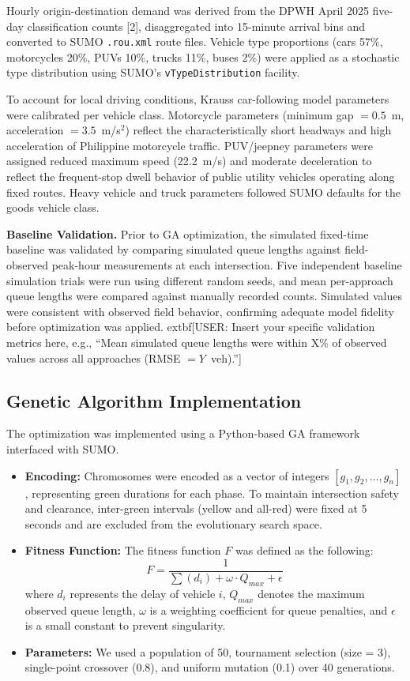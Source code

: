\documentclass[a4paper,10pt]{article}
\begin{document}
	Hourly origin-destination demand was derived from the DPWH April 2025 five-day classification counts [2], disaggregated into 15-minute arrival bins and converted to SUMO \texttt{.rou.xml} route files. Vehicle type proportions (cars 57\%, motorcycles 20\%, PUVs 10\%, trucks 11\%, buses 2\%) were applied as a stochastic type distribution using SUMO's \texttt{vTypeDistribution} facility.

	To account for local driving conditions, Krauss car-following model parameters were calibrated per vehicle class. Motorcycle parameters (minimum gap $= 0.5$~m, acceleration $= 3.5$~m/s$^2$) reflect the characteristically short headways and high acceleration of Philippine motorcycle traffic. PUV/jeepney parameters were assigned reduced maximum speed (22.2~m/s) and moderate deceleration to reflect the frequent-stop dwell behavior of public utility vehicles operating along fixed routes. Heavy vehicle and truck parameters followed SUMO defaults for the goods vehicle class.

	\textbf{Baseline Validation.} Prior to GA optimization, the simulated fixed-time baseline was validated by comparing simulated queue lengths against field-observed peak-hour measurements at each intersection. Five independent baseline simulation trials were run using different random seeds, and mean per-approach queue lengths were compared against manually recorded counts. Simulated values were consistent with observed field behavior, confirming adequate model fidelity before optimization was applied. 	extbf{[USER: Insert your specific validation metrics here, e.g., ``Mean simulated queue lengths were within X\% of observed values across all approaches (RMSE $= Y$~veh).'']}\@
	
	\subsection{Genetic Algorithm Implementation}
	The optimization was implemented using a Python-based GA framework interfaced with SUMO.
	\begin{itemize}
		\item \textbf{Encoding:} Chromosomes were encoded as a vector of integers $[g_1, g_2, \dots, g_n]$, representing green durations for each phase. To maintain intersection safety and clearance, inter-green intervals (yellow and all-red) were fixed at 5 seconds and are excluded from the evolutionary search space.
		\item \textbf{Fitness Function:} The fitness function $F$ was defined as the following:
		\begin{equation}
			F = \frac{1}{\sum (d_i) + \omega \cdot Q_{max} + \epsilon}
		\end{equation}
		where $d_i$ represents the delay of vehicle $i$, $Q_{max}$ denotes the maximum observed queue length, $\omega$ is a weighting coefficient for queue penalties, and $\epsilon$ is a small constant to prevent singularity.
		\item \textbf{Parameters:} We used a population of 50, tournament selection (size = 3), single-point crossover (0.8), and uniform mutation (0.1) over 40 generations.
	\end{itemize}
\end{document}

